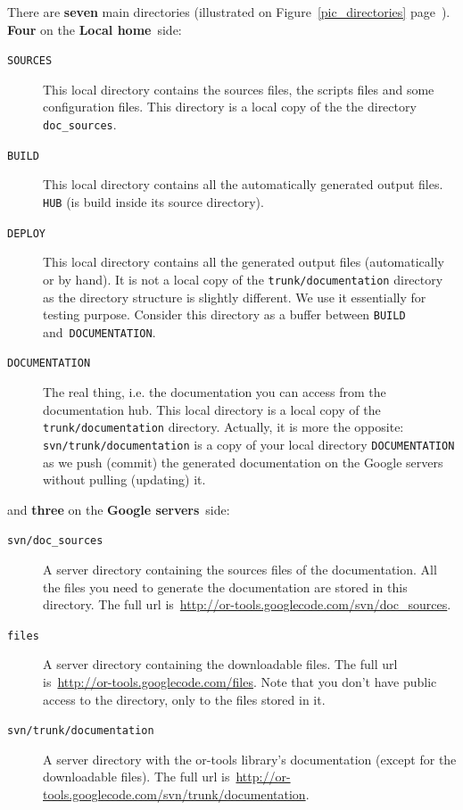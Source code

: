 \documentclass[a4paper,10pt]{article}
\newcommand{\code}[1]{\texttt{#1}}
\newcommand{\gservers}{{\bf Google servers}}
\newcommand{\lhome}{{\bf Local home}}
\begin{document}
There are {\bf seven} main directories (illustrated on Figure~\ref{pic_directories} page~\pageref{pic_directories}).\\

{\bf Four} on the \lhome\ side:

\begin{description}
 \item[\code{SOURCES}] This local directory contains the sources files, the scripts files and some configuration files. This directory is a local copy of the the directory \code{doc\_sources}.
 \item[\code{BUILD}] This local directory contains all the automatically generated output files.\\
\hspace{2cm}{\bf Exceptions:} \code{HUB} (is build inside its source directory).
 \item[\code{DEPLOY}]  This local directory contains all the generated output files (automatically or by hand). It is not a local copy of the \code{trunk/documentation} directory as the directory structure is slightly different. We use it essentially for testing purpose. Consider this directory as a buffer between \code{BUILD} and~\code{DOCUMENTATION}.
 \item[\code{DOCUMENTATION}] The real thing, i.e. the documentation you can access from the documentation hub. This local directory is a local copy of the \code{trunk/documentation} directory. Actually, it is more the opposite: \code{svn/trunk/documentation} is a copy of your local directory \code{DOCUMENTATION} as we push (commit) the generated documentation on the Google servers without pulling (updating) it.
\end{description}

and {\bf three} on the \gservers\ side:

\begin{description}
 \item[\code{svn/doc\_sources}] A server directory containing the sources files of the documentation. All the files you need to generate the documentation are stored in this directory. The full url is~\href{http://or-tools.googlecode.com/svn/doc\_sources}{http://or-tools.googlecode.com/svn/doc\_sources}.
 \item[\code{files}] A server directory containing the downloadable files. The full url is~\href{http://or-tools.googlecode.com/files}{http://or-tools.googlecode.com/files}. Note that you don't have public access to the directory, only to the files stored in it.
 \item[\code{svn/trunk/documentation}] A server directory with the or-tools library's documentation (except for the downloadable files). The full url is~\href{http://or-tools.googlecode.com/svn/trunk/documentation}{http://or-tools.googlecode.com/svn/trunk/documentation}.
\end{description}
\end{document}
